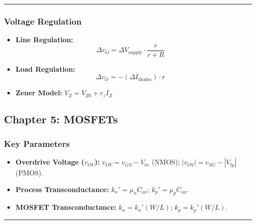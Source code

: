 \documentclass[10pt]{article}
\begin{document}
\begin{multicols}{2}
\hrule

\subsubsection*{Voltage Regulation}
\begin{itemize}
    \item \textbf{Line Regulation:} \[ \Delta v_O = \Delta V_{\text{supply}} \cdot \frac{r}{r + R} \quad \text{} \]
    \item \textbf{Load Regulation:} \[ \Delta v_O = -(\Delta I_{\text{diodes}}) \cdot r \quad \text{} \]
    \item \textbf{Zener Model:} \( V_Z = V_{Z0} + r_z I_Z \)
\end{itemize}

\columnbreak

\subsection*{Chapter 5: MOSFETs}

\subsubsection*{Key Parameters}
\begin{itemize}
    \item \textbf{Overdrive Voltage ($v_{OV}$):} \( v_{OV} = v_{GS} - V_{tn} \) (NMOS); \( |v_{OV}| = v_{SG} - |V_{tp}| \) (PMOS).
    \item \textbf{Process Transconductance:} \( k_n' = \mu_n C_{ox} \); \( k_p' = \mu_p C_{ox} \).
    \item \textbf{MOSFET Transconductance:} \( k_n = k_n' (W/L) \); \( k_p = k_p' (W/L) \).
\end{itemize}

\hrule


\end{multicols}
\end{document}
